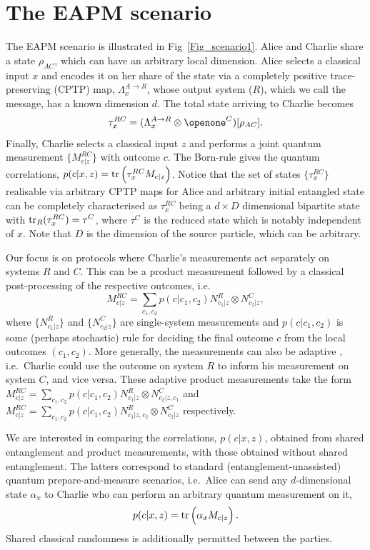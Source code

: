 \documentclass[aps,superscriptaddress,twocolumn,twoside,floatfix,pra,nofootinbib,a4paper]{revtex4-2}
\begin{document}
\section{The EAPM scenario}\label{sec0}
The EAPM scenario is illustrated in Fig~\ref{Fig_scenario1}. Alice and Charlie share a state $\rho_{AC}$, which can have an arbitrary local dimension. Alice selects a classical input $x$ and encodes it on her share of the state via a completely positive trace-preserving (CPTP) map, $\Lambda_x^{A\rightarrow R}$, whose output system ($R$), which we call the message, has a known dimension $d$. The total state arriving to Charlie becomes
\begin{equation}
\tau_x^{RC}=(\Lambda_x^{A\rightarrow R}\otimes \openone^C)[\rho_{AC}].
\end{equation}
Finally, Charlie selects a classical input $z$ and performs a joint quantum measurement $\{M^{RC}_{c|z}\}$ with outcome $c$. The Born-rule gives the quantum correlations, $p(c|x,z)=\tr\left(\tau_x^{RC} M_{c|z}\right)$. Notice that the set of states $\{\tau_x^{RC}\}$ realisable via arbitrary CPTP maps for Alice and arbitrary initial entangled state can be completely characterised as  $\tau_{x}^{RC}$ being a $d\times D$ dimensional bipartite state with $\tr_R(\tau_x^{RC})=\tau^C$, where $\tau^C$ is the reduced state which is notably independent of $x$. Note that $D$ is the dimension of the source particle, which can be arbitrary.


Our focus is on protocols where Charlie's measurements act separately on systems $R$ and $C$. This can be a product measurement followed by a classical post-processing of the respective outcomes, i.e.~
\begin{equation}\label{prod}
M^{RC}_{c|z}=\sum_{c_1,c_2} p(c|c_1,c_2) N^R_{c_1|z} \otimes N^C_{c_2|z},
\end{equation}
where $\{N^R_{c_1|z}\}$ and $\{N^C_{c_2|z}\}$ are single-system measurements and $p(c|c_1,c_2)$ is some (perhaps stochastic) rule for deciding the final outcome $c$ from the local outcomes $(c_1,c_2)$. More generally, the measurements can also be adaptive \cite{Pauwels2022b}, i.e.~Charlie could use the outcome on system $R$ to inform his measurement on system $C$, and vice versa. These adaptive product measurements take the form  $
M^{RC}_{c|z}=\sum_{c_1,c_2} p(c|c_1,c_2) N^R_{c_1|z} \otimes N^C_{c_2|z,c_1}$ and $M^{RC}_{c|z}=\sum_{c_1,c_2} p(c|c_1,c_2) N^R_{c_1|z,c_2} \otimes N^C_{c_2|z}$ respectively.

We are interested in comparing the correlations, $p(c|x,z)$, obtained from shared entanglement and product measurements, with those obtained without shared entanglement. The latters correspond to standard (entanglement-unassisted) quantum prepare-and-measure scenarios, i.e.~Alice can send any $d$-dimensional state $\alpha_x$ to Charlie who can perform an arbitrary quantum measurement on it,
\begin{equation}\label{PM}
p(c|x,z)=\tr\left(\alpha_x M_{c|z}\right).
\end{equation}
Shared classical randomness is additionally permitted between the parties.
\end{document}
